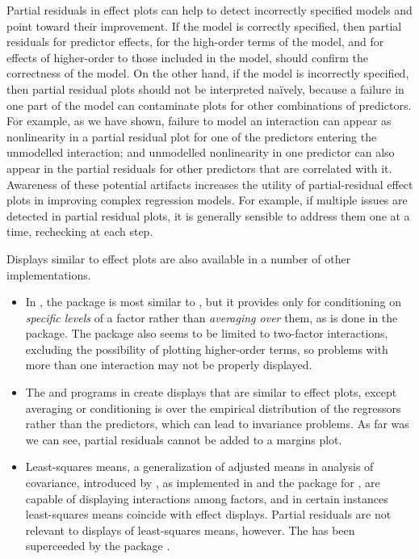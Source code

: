 \documentclass[article]{jss}
\newcommand{\R}{\proglang{R}}
\begin{document}
Partial residuals in effect plots can help to detect incorrectly
specified models and point toward their improvement. If the model is
correctly specified, then partial residuals for predictor effects, for
the high-order terms of the model, and for effects of higher-order to
those included in the model, should confirm the correctness of the
model. On the other hand, if the model is incorrectly specified, then
partial residual plots should not be interpreted na\"{i}vely, because
a failure in one part of the model can contaminate plots for other
combinations of predictors. For example, as we have shown, failure to
model an interaction can appear as nonlinearity in a partial residual
plot for one of the predictors entering the unmodelled interaction;
and unmodelled nonlinearity in one predictor can also appear in the
partial residuals for other predictors that are correlated with
it. Awareness of these potential artifacts increases the utility of
partial-residual effect plots in improving complex regression
models. For example, if multiple issues are detected in partial
residual plots, it is generally sensible to address them one at a
time, rechecking at each step.

Displays similar to effect plots are also available in a number of other implementations.
\begin{itemize}

\item In , the  \citep{visreg} package is most
  similar to , but it provides only for conditioning on
  \emph{specific levels} of a factor rather than \emph{averaging over}
  them, as is done in the  package.  The 
  package also seems to be limited to two-factor interactions,
  excluding the possibility of plotting higher-order terms, so
  problems with more than one interaction may not be properly
  displayed.

\item The  and  programs in
   \citep{Stata15} create displays that are similar to
  effect plots, except averaging or conditioning is over the empirical
  distribution of the regressors rather than the predictors, which can
  lead to invariance problems.  As far was we can see, partial
  residuals cannot be added to a margins plot.

\item Least-squares means, a generalization of adjusted means in
  analysis of covariance, introduced by \citealp{Fisher36}, as
  implemented in  \citep{sas12} and the 
  package for \R{} \citep{Lenth16, LenthHerve15}, are capable of
  displaying interactions among factors, and in certain instances
  least-squares means coincide with effect displays. Partial residuals
  are not relevant to displays of least-squares means, however. The 
   has been superceeded by the  package 
  \citep{lenth18}.
\end{itemize}
\end{document}
